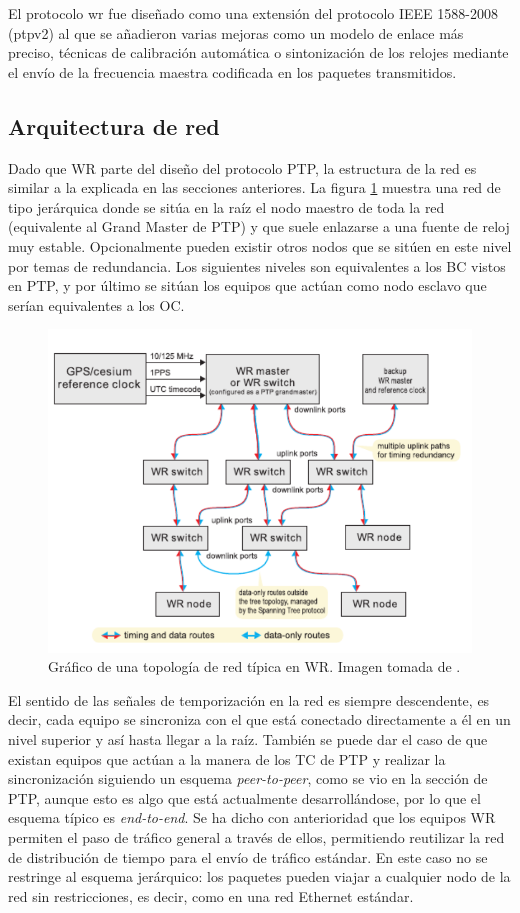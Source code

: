 El protocolo \gls{wr} fue diseñado como una extensión del protocolo IEEE 
1588-2008 (\gls{ptp}v2) al que se añadieron varias mejoras como un modelo de 
enlace más preciso, técnicas de calibración automática o sintonización de los 
relojes mediante el envío de la frecuencia maestra codificada en los paquetes 
transmitidos.

\subsection{Arquitectura de red}

Dado que WR parte del diseño del protocolo PTP, la estructura de la red es 
similar a la explicada en las secciones anteriores. La figura 
\ref{fig:wrtopology} muestra una red de tipo jerárquica donde se sitúa en la 
raíz el nodo maestro de toda la red (equivalente al Grand Master de PTP) y que 
suele enlazarse a una fuente de reloj muy estable. Opcionalmente pueden existir 
otros nodos que se sitúen en este nivel por temas de redundancia. Los 
siguientes niveles son equivalentes a los BC vistos en PTP, y por último se 
sitúan los equipos que actúan como nodo esclavo que serían equivalentes a los 
OC.

\begin{figure}
	\centering
	\includegraphics[width=0.7\linewidth]{imagenes/wr_topology}
	\caption[Topología de red en WR]{Gráfico de una topología de red típica en 
	WR. Imagen tomada de \cite{Daniluk2012}.}
	\label{fig:wrtopology}
\end{figure}

El sentido de las señales de temporización en la red es siempre descendente, es 
decir, cada equipo se sincroniza con el que está conectado directamente a él en 
un nivel superior y así hasta llegar a la raíz. También se puede dar el caso de 
que existan equipos que actúan a la manera de los TC de PTP y realizar la 
sincronización siguiendo un esquema \textit{peer-to-peer}, como se vio en la 
sección de PTP, aunque esto es algo que está actualmente desarrollándose, por 
lo que el esquema típico es \textit{end-to-end}. Se ha dicho con anterioridad 
que los equipos WR permiten el paso de tráfico general a través de ellos, 
permitiendo reutilizar la red de distribución de tiempo para el envío de 
tráfico estándar. En este caso no se restringe al esquema jerárquico: los 
paquetes pueden viajar a cualquier nodo de la red sin restricciones, es decir, 
como en una red Ethernet estándar.


